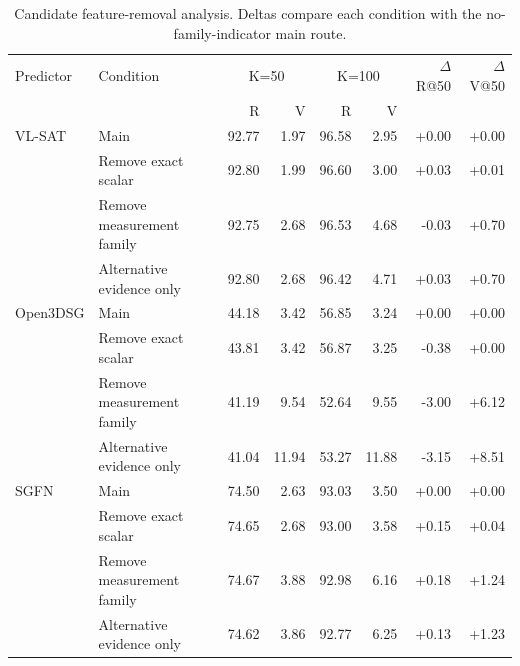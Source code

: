\begin{table}[t]
\centering\small
\begin{tabular}{@{}llrrrrrr@{}}
\toprule
Predictor & Condition & \multicolumn{2}{c}{K=50} & \multicolumn{2}{c}{K=100} & $\Delta$R@50 & $\Delta$V@50 \\
& & R & V & R & V & & \\
\midrule
VL-SAT & Main & 92.77 & 1.97 & 96.58 & 2.95 & +0.00 & +0.00 \\
 & Remove exact scalar & 92.80 & 1.99 & 96.60 & 3.00 & +0.03 & +0.01 \\
 & Remove measurement family & 92.75 & 2.68 & 96.53 & 4.68 & -0.03 & +0.70 \\
 & Alternative evidence only & 92.80 & 2.68 & 96.42 & 4.71 & +0.03 & +0.70 \\
\midrule
Open3DSG & Main & 44.18 & 3.42 & 56.85 & 3.24 & +0.00 & +0.00 \\
 & Remove exact scalar & 43.81 & 3.42 & 56.87 & 3.25 & -0.38 & +0.00 \\
 & Remove measurement family & 41.19 & 9.54 & 52.64 & 9.55 & -3.00 & +6.12 \\
 & Alternative evidence only & 41.04 & 11.94 & 53.27 & 11.88 & -3.15 & +8.51 \\
\midrule
SGFN & Main & 74.50 & 2.63 & 93.03 & 3.50 & +0.00 & +0.00 \\
 & Remove exact scalar & 74.65 & 2.68 & 93.00 & 3.58 & +0.15 & +0.04 \\
 & Remove measurement family & 74.67 & 3.88 & 92.98 & 6.16 & +0.18 & +1.24 \\
 & Alternative evidence only & 74.62 & 3.86 & 92.77 & 6.25 & +0.13 & +1.23 \\
\bottomrule
\end{tabular}
\caption{Candidate feature-removal analysis. Deltas compare each condition with the no-family-indicator main route.}
\label{tab:no-family-heldout}
\end{table}
